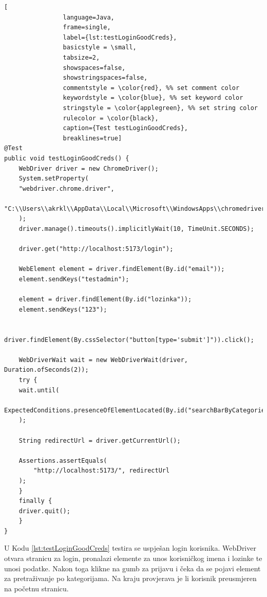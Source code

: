 \renewcommand{\lstlistingname}{Kod}
\begin{lstlisting}[
				language=Java,
				frame=single,
				label={lst:testLoginGoodCreds},
				basicstyle = \small,
				tabsize=2,
				showspaces=false,
				showstringspaces=false,
				commentstyle = \color{red}, %% set comment color
				keywordstyle = \color{blue}, %% set keyword color
				stringstyle = \color{applegreen}, %% set string color
				rulecolor = \color{black},
				caption={Test testLoginGoodCreds},
				breaklines=true]
@Test
public void testLoginGoodCreds() {
	WebDriver driver = new ChromeDriver();
	System.setProperty(
	"webdriver.chrome.driver", 
	"C:\\Users\\akrkl\\AppData\\Local\\Microsoft\\WindowsApps\\chromedriver.exe"
	);
	driver.manage().timeouts().implicitlyWait(10, TimeUnit.SECONDS);

	driver.get("http://localhost:5173/login");

	WebElement element = driver.findElement(By.id("email"));
	element.sendKeys("testadmin");

	element = driver.findElement(By.id("lozinka"));
	element.sendKeys("123");

	driver.findElement(By.cssSelector("button[type='submit']")).click();

	WebDriverWait wait = new WebDriverWait(driver, Duration.ofSeconds(2));
	try {
	wait.until(
		ExpectedConditions.presenceOfElementLocated(By.id("searchBarByCategories"))
	);

	String redirectUrl = driver.getCurrentUrl();

	Assertions.assertEquals(
		"http://localhost:5173/", redirectUrl
	);
	}
	finally {
	driver.quit();
	}
}	
			\end{lstlisting}

U Kodu \ref{lst:testLoginGoodCreds} testira se uspješan login korisnika. WebDriver otvara stranicu za login, pronalazi elemente za unos korisničkog imena i lozinke te unosi podatke. Nakon toga klikne na gumb za prijavu i čeka da se pojavi element za pretraživanje po kategorijama. Na kraju provjerava je li korisnik preusmjeren na početnu stranicu.

\pagebreak

